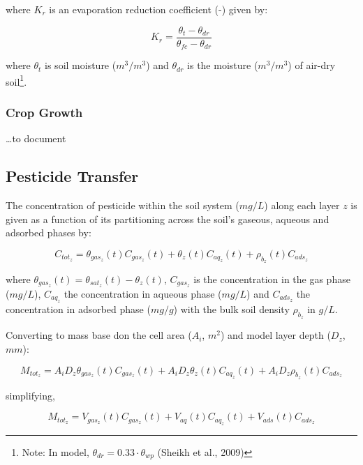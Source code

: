 \documentclass[]{article}
\let\rmarkdownfootnote\footnote%
\def\footnote{\protect\rmarkdownfootnote}
\begin{document}
where \(K_r\) is an evaporation reduction coefficient (-) given by:

\begin{equation}
K_r = \frac{ \theta_t - \theta_{dr} }{ \theta_{fc} - \theta_{dr} }
\label{eq:Kr}  
\end{equation}

where \(\theta_t\) is soil moisture (\(m^3/m^3\)) and \(\theta_{dr}\) is
the moisture (\(m^3/m^3\)) of air-dry
soil\footnote{Note: In model, $\theta_{dr} = 0.33 \cdot \theta_{wp}$ (Sheikh et al., 2009)}.

\subsubsection{Crop Growth}\label{crop-growth}

\ldots{}to document

\subsection{Pesticide Transfer}\label{pesticide-transfer}

The concentration of pesticide within the soil system (\(mg/L\)) along
each layer \(z\) is given as a function of its partitioning across the
soil's gaseous, aqueous and adsorbed phases by:

\begin{equation}
C_{tot_z} = \theta_{gas_z}(t)C_{gas_z}(t) + \theta_z(t)C_{aq_z}(t) + \rho_{b_z}(t)C_{ads_z}
\label{eq:conc_tot}  
\end{equation}

where \(\theta_{gas_z}(t) = \theta_{sat_z}(t) - \theta_{z}(t)\),
\(C_{gas_z}\) is the concentration in the gas phase (\(mg/L\)),
\(C_{aq_z}\) the concentration in aqueous phase (\(mg/L\)) and
\(C_{ads_z}\) the concentration in adsorbed phase (\(mg/g\)) with the
bulk soil density \(\rho_{b_z}\) in \(g/L\).

Converting to mass base don the cell area (\(A_i\), \(m^2\)) and model
layer depth (\(D_z\), \(mm\)):

\begin{equation}
M_{tot_z} = A_iD_z\theta_{gas_z}(t)C_{gas_z}(t) + A_iD_z\theta_z(t)C_{aq_z}(t) + A_iD_z\rho_{b_z}(t)C_{ads_z}
\label{eq:mass_tot}  
\end{equation}

simplifying,

\begin{equation}
M_{tot_z} = V_{gas_z}(t)C_{gas_z}(t) + V_{aq}(t)C_{aq_z}(t) + V_{ads}(t)C_{ads_z}
\label{eq:mass_tot_simple}  
\end{equation}
\end{document}
